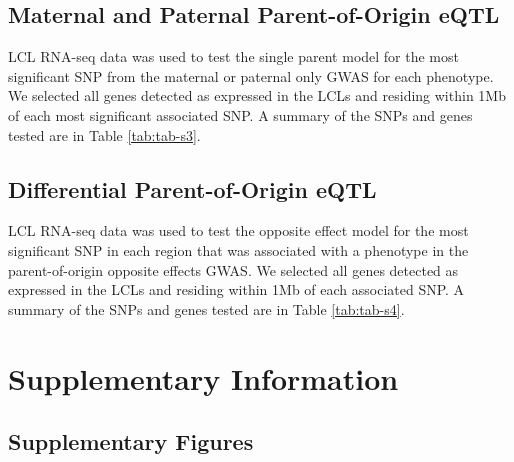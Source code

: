 \subsection{Maternal and Paternal Parent-of-Origin eQTL}\label{Maternal and Paternal Parent-of-Origin Parent-of-Origin eQTL}

LCL RNA-seq data was used to test the single parent model for the most significant SNP from the maternal or paternal only GWAS for each phenotype. We selected all genes detected as expressed in the LCLs and residing within 1Mb of each most significant associated SNP. A summary of the SNPs and genes tested are in Table \ref{tab:tab-s3}.

\subsection{Differential Parent-of-Origin eQTL}\label{Differential Parent-of-Origin eQTL}

LCL RNA-seq data was used to test the opposite effect model for the most significant SNP in each region that was associated with a phenotype in the parent-of-origin opposite effects GWAS. We selected all genes detected as expressed in the LCLs and residing within 1Mb of each associated SNP. A summary of the SNPs and genes tested are in Table \ref{tab:tab-s4}.

\clearpage
\section{Supplementary Information}\label{fig-supplementary-information}

\subsection{Supplementary Figures}\label{fig-supplementary-figures}

